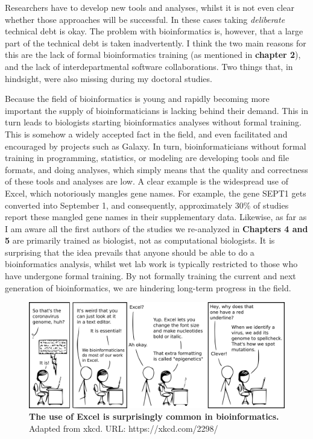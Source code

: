 Researchers have to develop new tools and analyses, whilst it is not even clear whether those approaches will be successful. In these cases taking \textit{deliberate} technical debt is okay. The problem with bioinformatics is, however, that a large part of the technical debt is taken inadvertently. I think the two main reasons for this are the lack of formal bioinformatics training (as mentioned in \textbf{chapter 2}), and the lack of interdepartmental software collaborations. Two things that, in hindsight, were also missing during my doctoral studies. 

Because the field of bioinformatics is young and rapidly becoming more important the supply of bioinformaticians is lacking behind their demand. This in turn leads to biologists starting bioinformatics analyses without formal training. This is somehow a widely accepted fact in the field, and even facilitated and encouraged by projects such as Galaxy\cite{galaxy}. In turn, bioinformaticians without formal training in programming, statistics, or modeling are developing tools and file formats, and doing analyses, which simply means that the quality and correctness of these tools and analyses are low. A clear example is the widespread use of Excel, which notoriously mangles gene names\cite{Zeeberg2004}. For example, the gene SEPT1 gets converted into September 1, and consequently, approximately $30\%$ of studies report these mangled gene names in their supplementary data\cite{Abeysooriya2021}. Likewise, as far as I am aware all the first authors of the studies we re-analyzed in \textbf{Chapters 4 and 5} are primarily trained as biologist, not as computational biologists. It is surprising that the idea prevails that anyone should be able to do a bioinformatics analysis, whilst wet lab work is typically restricted to those who have undergone formal training. By not formally training the current and next generation of bioinformatics, we are hindering long-term progress in the field.

\begin{figure}[H]
    \centering
    \includegraphics[width=0.85\linewidth]{ch.discussion/imgs/xkcd_excel.png}
    \caption{\textbf{The use of Excel is surprisingly common in bioinformatics.} Adapted from xkcd. URL: https://xkcd.com/2298/}
    \label{fig:xkcd_excel}
\end{figure}

